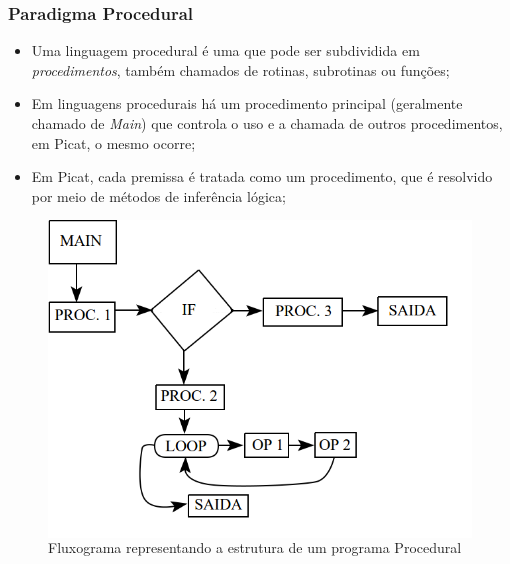 \begin{frame}[fragile]
	\frametitle{Paradigma Procedural}
    
    \begin{itemize}
    
    	\item Uma linguagem procedural é uma que pode ser subdividida em \textit{procedimentos},
        também chamados de rotinas, subrotinas ou funções;
        
        \item Em linguagens procedurais há um procedimento principal (geralmente chamado de 
        \textit{Main}) que controla o uso e a chamada de outros procedimentos, em Picat, o mesmo
        ocorre;
        
        \item Em Picat, cada premissa é tratada como um procedimento, que é resolvido por meio
        de métodos de inferência lógica;
       
    \end{itemize}
    
    \begin{figure}
    	\begin{columns}
	         \includegraphics[width=.8\textwidth] {figures/Paradigma_Procedural.png}
             \caption{Fluxograma representando a estrutura de um programa Procedural}
	         \label{Fluxograma Procedural}
		\end{columns}
	\end{figure}
    
\end{frame}


